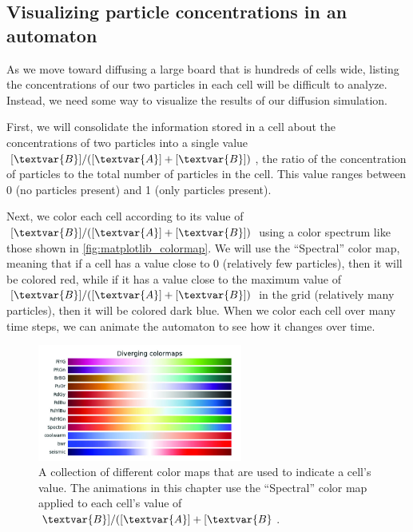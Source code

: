 \begin{qbox}[%
Update the cells in \autoref{fig:two_particle_concentration_diffusion} after another generation of diffusion, using the diffusion rates $d_A = 0.2$ and $d_B = 0.1$.
]\end{qbox}

\FloatBarrier
{}
\subsection{Visualizing particle concentrations in an automaton}

As we move toward diffusing a large board that is hundreds of cells wide, listing the concentrations of our two particles in each cell will be difficult to analyze. Instead, we need some way to visualize the results of our diffusion simulation.

First, we will consolidate the information stored in a cell about the concentrations of two particles into a single value $[\textvar{B}]/([\textvar{A}] + [\textvar{B}])$, the ratio of the concentration of  particles to the total number of particles in the cell. This value ranges between 0 (no  particles present) and 1 (only  particles present).\\

\begin{qbox}\end{qbox}

Next, we color each cell according to its value of $[\textvar{B}]/([\textvar{A}] + [\textvar{B}])$ using a color spectrum like those shown in \autoref{fig:matplotlib_colormap}. We will use the ``Spectral'' color map, meaning that if a cell has a value close to 0 (relatively few  particles), then it will be colored red, while if it has a value close to the maximum value of $[\textvar{B}]/([\textvar{A}] + [\textvar{B}])$ in the grid (relatively many  particles), then it will be colored dark blue. When we color each cell over many time steps, we can animate the automaton to see how it changes over time.\\

\begin{figure}[h]
\centering
\mySfFamily
\includegraphics[width = 0.6\textwidth]{../images_CMYK/matplotlib_colormap}
\caption{A collection of different color maps that are used to indicate a cell's value. The animations in this chapter use the ``Spectral'' color map applied to each cell's value of $\textvar{B}]/([\textvar{A}] + [\textvar{B}$.}
\label{fig:matplotlib_colormap}
\end{figure}

